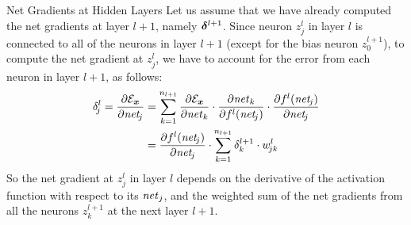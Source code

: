 \begin{frame}{Net Gradients at Hidden Layers}
Let us assume that we have already computed the net gradients at layer
$l+1$, namely ${\bm \delta}^{l+1}$.
Since neuron $z^l_{\!j}$ in layer $l$ is connected to all of the neurons in
layer $l+1$ (except for the bias neuron $z^{l+1}_0$), 
to compute the net gradient at
$z^l_{\!j}$, we
have to account for the error from each neuron in layer $l+1$, as
follows:
\begin{align*}
    \delta^l_{\!j} = \frac{\partial \cE_\bx}{\partial \net_{\!j}}
    & =
    \sum^{n_{l+1}}_{k=1} \frac{\partial \cE_\bx}{\partial \net_k} \cdot
    \frac{\partial \net_{k}}{\partial f^l(\net_{\!j})} \cdot
    \frac{\partial f^l(\net_{\!j})}{\partial \net_{\!j}}\\
& = \frac{\partial f^l(\net_{\!j})}{\partial \net_{\!j}} \cdot 
\sum^{n_{l+1}}_{k=1} \delta^{l+1}_k \cdot w^l_{\!jk}
\end{align*}
So the net gradient at $z^l_{\!j}$ in layer $l$ depends on the derivative of the 
activation function with respect to its $\mathit{net}_j$, and the 
weighted sum of the net gradients from
all the neurons $z^{l+1}_k$ at the next layer $l+1$.
\end{frame}
%
